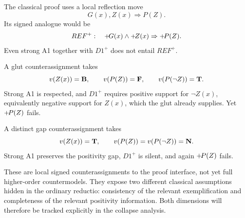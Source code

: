 The classical proof uses a local reflection move
\[
  G(x),Z(x)\Rightarrow P(Z).
\]
Its signed analogue would be
\[
  REF^+:\quad +\!G(x)\land+\!Z(x)\Rightarrow+\!P(Z).
\]
Even strong A1 together with \(D1^+\) does not entail \(REF^+\).

A glut counterassignment takes
\[
  v(Z(x))=\mathbf{B},\qquad v(P(Z))=\mathbf{F},\qquad v(P(\neg Z))=\mathbf{T}.
\]
Strong A1 is respected, and \(D1^+\) requires positive support for \(\neg Z(x)\), equivalently negative support for \(Z(x)\), which the glut already supplies. Yet \(+\!P(Z)\) fails.

A distinct gap counterassignment takes
\[
  v(Z(x))=\mathbf{T},\qquad v(P(Z))=v(P(\neg Z))=\mathbf{N}.
\]
Strong A1 preserves the positivity gap, \(D1^+\) is silent, and again \(+\!P(Z)\) fails.

These are local signed counterassignments to the proof interface, not yet full higher-order countermodels. They expose two different classical assumptions hidden in the ordinary reductio: consistency of the relevant exemplification and completeness of the relevant positivity information. Both dimensions will therefore be tracked explicitly in the collapse analysis.
